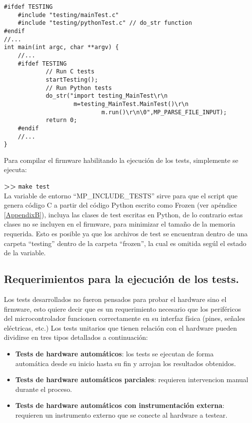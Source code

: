 \begin{lstlisting}[label={lst:mainc},caption=Inclusión de los archivos de test en el main.]
#ifdef TESTING
    #include "testing/mainTest.c"
    #include "testing/pythonTest.c" // do_str function
#endif
//...
int main(int argc, char **argv) {
	//...
	#ifdef TESTING
			// Run C tests
			startTesting();
			// Run Python tests
			do_str("import testing_MainTest\r\n
			        m=testing_MainTest.MainTest()\r\n
							m.run()\r\n\0",MP_PARSE_FILE_INPUT);
			return 0;
	#endif
	//...
}
\end{lstlisting}

Para compilar el firmware habilitando la ejecución de los tests, simplemente se ejecuta:

\textbf{{\fontsize{16}{16}\selectfont \textgreater\textgreater}} \texttt{make test}\\

La variable de entorno “MP\_INCLUDE\_TESTS” sirve para que el script que genera código C a partir del código Python escrito como Frozen (ver apéndice \ref{AppendixB}), incluya las clases de test escritas en Python, de lo contrario estas clases no se incluyen en el firmware, para minimizar el tamaño de la memoria requerida. Esto es posible ya que los archivos de test se encuentran dentro de una carpeta “testing” dentro de la carpeta “frozen”, la cual es omitida segúl el estado de la variable.

\subsection{Requerimientos para la ejecución de los tests.}
\label{sec:requerimientosEjecucionTests}

Los tests desarrollados no fueron pensados para probar el hardware sino el firmware, esto quiere decir que es un requerimiento necesario que los periféricos del microcontrolador funcionen correctamente en su interfaz física (pines, señales eléctricas, etc.)
Los tests unitarios que tienen relación con el hardware pueden dividirse en tres tipos \cite{tdd} detallados a continuación:

\begin{itemize}
	\item \textbf{Tests de hardware automáticos}: los tests se ejecutan de forma automática desde su inicio hasta su fin y arrojan los resultados obtenidos.
	\item \textbf{Tests de hardware automáticos parciales}: requieren intervencion manual durante el proceso.
	\item \textbf{Tests de hardware automáticos con instrumentación externa}: requieren un instrumento externo que se conecte al hardware a testear.
\end{itemize}


